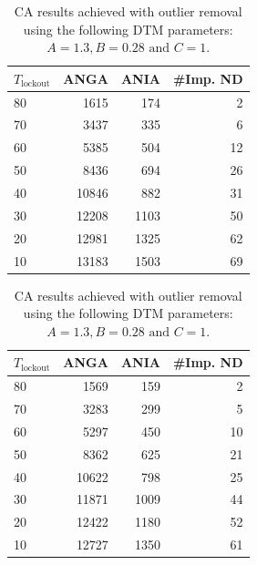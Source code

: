 \begin{table}[h]
\centering
\begin{subtable}[h]{0.45\textwidth}
\begin{tabular}{lrrr}
\hline
 $T_{\text{lockout}}$ & ANGA  & ANIA & \#Imp. ND  \\ \hline
 80                   & 1615  & 174  & 2          \\
 70                   & 3437  & 335  & 6          \\
 60                   & 5385  & 504  & 12         \\
 50                   & 8436  & 694  & 26         \\
 40                   & 10846 & 882  & 31         \\
 30                   & 12208 & 1103 & 50         \\
 20                   & 12981 & 1325 & 62         \\
 10                   & 13183 & 1503 & 69         
 \end{tabular}
 \caption{Without reference cutoff.}
 \label{tab:CA-outliers-removed-without-cutoff}
\end{subtable}
\hfill
\begin{subtable}[h]{0.45\textwidth}
\centering
\begin{tabular}{lrrr}
\hline
 $T_{\text{lockout}}$ & ANGA  & ANIA & \#Imp. ND \\ \hline
 80                   & 1569  & 159  & 2         \\
 70                   & 3283  & 299  & 5         \\
 60                   & 5297  & 450  & 10        \\
 50                   & 8362  & 625  & 21        \\
 40                   & 10622 & 798  & 25        \\
 30                   & 11871 & 1009 & 44        \\
 20                   & 12422 & 1180 & 52        \\
 10                   & 12727 & 1350 & 61       
\end{tabular}
\caption{With reference cutoff.}
\label{tab:CA-outliers-removed-with-cutoff}
\end{subtable}
\caption{CA results achieved with outlier removal using the following DTM parameters: $A= 1.3, B = 0.28 \text{ and } C=1$.}
\label{tab:CA-outliers-removed}
\end{table}


